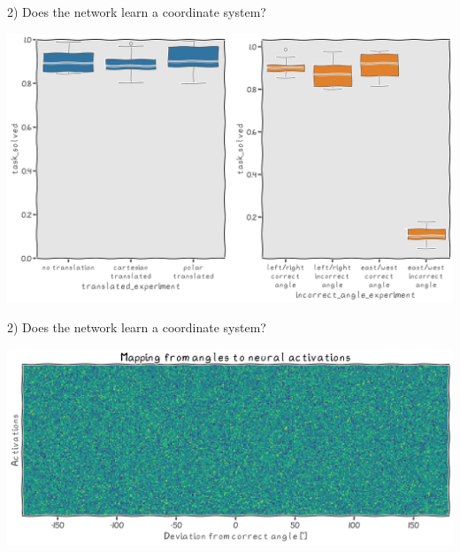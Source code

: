\documentclass[bigger]{beamer}
\begin{document}
\begin{frame}[label={sec:org154455c}]{2) Does the network learn a coordinate system?}
\begin{center}
\includegraphics[width=.9\linewidth]{img/exp2-boxplot.png}
\end{center}
\end{frame}
\begin{frame}[label={sec:orge0d12be}]{2) Does the network learn a coordinate system?}
\begin{center}
\includegraphics[width=.9\linewidth]{img/angles-to-activations.png}
\end{center}
\end{frame}
\end{document}
